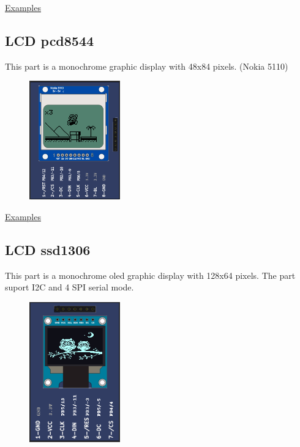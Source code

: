 \href{https://lcgamboa.github.io/picsimlab_examples/parts_LCD_pcf8833.html}{Examples}


\subsection{LCD pcd8544 }

This part is a monochrome graphic display with 48x84 pixels. (Nokia 5110)

\begin{figure}[H]
\center
\includegraphics[width=0.35\textwidth]{img/part_pcd8544.png} 
\end{figure} 

\href{https://lcgamboa.github.io/picsimlab_examples/parts_LCD_pcd8544.html}{Examples}

\vspace{0.5cm}

\subsection{LCD ssd1306 }

This part is a monochrome oled graphic display with 128x64 pixels. 
The part suport I2C and 4 SPI serial mode.

\begin{figure}[H]
\center
\includegraphics[width=0.35\textwidth]{img/part_lcd_ssd1306.png} 
\end{figure} 

